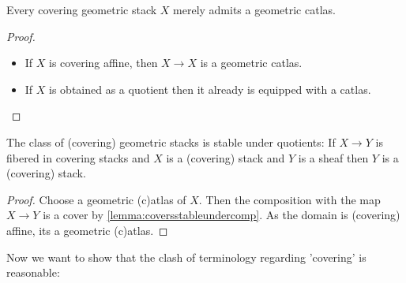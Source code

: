 \begin{prop}{\label{prop:csHasAtlas}}
	Every covering geometric stack $X$ merely admits a geometric catlas. %
\end{prop}

\begin{proof}
	\begin{itemize}
		\item If 	$X$ is covering affine, then $X \to X$ is a geometric catlas. 
		\item If $X$ is obtained as a quotient then it already is equipped with a catlas. %
		
	\end{itemize}
\end{proof}
\begin{prop}{\label{prop:stackQuot}}
	The class of (covering) geometric stacks is stable under quotients: If $X \to Y$ is fibered in covering stacks and $X$ is a (covering) stack and $Y$ is a sheaf then $Y$ is a (covering) stack.
\end{prop}
\begin{proof}
	Choose a geometric (c)atlas of $X$. Then the composition with the map $X \to Y$ is a cover by \ref{lemma:coversstableundercomp}. As the domain is (covering) affine, its a geometric (c)atlas.
\end{proof}
Now we want to show that the clash of terminology regarding 'covering' is reasonable:


